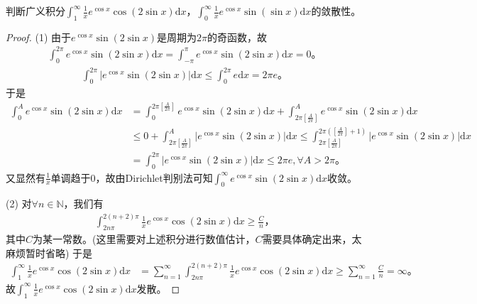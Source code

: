 \documentclass[../../main.tex]{subfiles}
\begin{document}
\begin{example}
判断广义积分\(\int_{1}^{\infty}\frac{1}{x}e^{\cos x}\cos(2\sin x)\mathrm{d}x\)，\(\int_{0}^{\infty}\frac{1}{x}e^{\cos x}\sin(\sin x)\mathrm{d}x\)的敛散性。 
\end{example}
\begin{proof}
(1) 由于\(e^{\cos x}\sin \left( 2\sin x \right)\)是周期为\(2\pi\)的奇函数，故
\begin{align*}
\int_0^{2\pi}{e^{\cos x}\sin \left( 2\sin x \right) \mathrm{d}x}=\int_{-\pi}^{\pi}{e^{\cos x}\sin \left( 2\sin x \right) \mathrm{d}x}=0。
\end{align*}
\begin{align*}
\int_0^{2\pi}{\left| e^{\cos x}\sin \left( 2\sin x \right) \right|\mathrm{d}x}\leqslant \int_0^{2\pi}{e\mathrm{d}x}=2\pi e。
\end{align*}
于是
\begin{align*}
\int_0^A{e^{\cos x}\sin \left( 2\sin x \right) \mathrm{d}x}&=\int_0^{2\pi \left[ \frac{A}{2\pi} \right]}{e^{\cos x}\sin \left( 2\sin x \right) \mathrm{d}x}+\int_{2\pi \left[ \frac{A}{2\pi} \right]}^A{e^{\cos x}\sin \left( 2\sin x \right) \mathrm{d}x} \\
&\leqslant 0+\int_{2\pi \left[ \frac{A}{2\pi} \right]}^A{\left| e^{\cos x}\sin \left( 2\sin x \right) \right|\mathrm{d}x} 
\leqslant \int_{2\pi \left[ \frac{A}{2\pi} \right]}^{2\pi \left( \left[ \frac{A}{2\pi} \right] +1 \right)}{\left| e^{\cos x}\sin \left( 2\sin x \right) \right|\mathrm{d}x} \\
&=\int_0^{2\pi}{\left| e^{\cos x}\sin \left( 2\sin x \right) \right|\mathrm{d}x}\leqslant 2\pi e,\forall A>2\pi。
\end{align*}
又显然有\(\frac{1}{x}\)单调趋于\(0\)，故由Dirichlet判别法可知\(\int_0^{\infty}{e^{\cos x}\sin \left( 2\sin x \right) \mathrm{d}x}\)收敛。

(2) 对\(\forall n\in \mathbb{N}\)，我们有
\begin{align*}
\int_{2n\pi}^{2\left( n+2 \right) \pi}{\frac{1}{x}e^{\cos x}\cos \left( 2\sin x \right) \mathrm{d}x}\geqslant \frac{C}{n}，
\end{align*}
其中\(C\)为某一常数。(这里需要对上述积分进行数值估计，\(C\)需要具体确定出来，太麻烦暂时省略) 于是
\begin{align*}
\int_1^{\infty}{\frac{1}{x}e^{\cos x}\cos(2\sin x)\mathrm{d}x}&=\sum_{n=1}^{\infty}{\int_{2n\pi}^{2\left( n+2 \right) \pi}{\frac{1}{x}e^{\cos x}\cos \left( 2\sin x \right) \mathrm{d}x}} 
\geqslant \sum_{n=1}^{\infty}{\frac{C}{n}}=\infty。
\end{align*}
故\(\int_1^{\infty}{\frac{1}{x}e^{\cos x}\cos(2\sin x)\mathrm{d}x}\)发散。

\end{proof}
\end{document}
